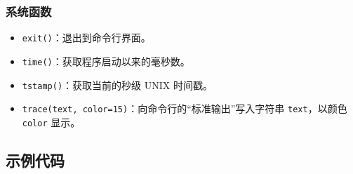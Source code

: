 \documentclass[UTF8]{ctexart}
\begin{document}
\subsubsection{系统函数}

\begin{itemize}
    \item \texttt{exit()}：退出到命令行界面。
    \item \texttt{time()}：获取程序启动以来的毫秒数。
    \item \texttt{tstamp()}：获取当前的秒级 UNIX 时间戳。
    \item \texttt{trace(text, color=15)}：向命令行的“标准输出”写入字符串 \texttt{text}，以颜色 \texttt{color} 显示。
\end{itemize}

\subsection{示例代码}
\end{document}
